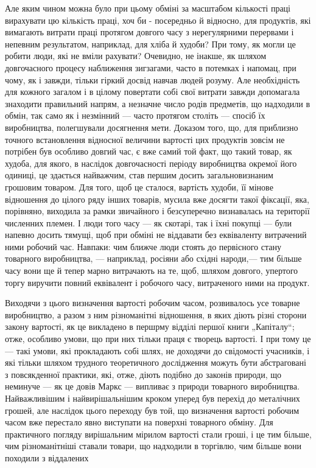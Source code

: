 Але яким чином можна було при цьому обміні за масштабом кількості праці вирахувати цю кількість праці, хоч би - посередньо й
відносно, для продуктів, які вимагають витрати праці протягом довгого часу з нерегулярними перервами і непевним результатом,
наприклад, для хліба й худоби? При тому, як могли це робити люди, які не вміли рахувати? Очевидно, не інакше, як шляхом
довгочасного процесу наближення зигзагами, часто в потемках і напомац, при чому, як і завжди, тільки гіркий досвід навчав
людей розуму. Але необхідність для кожного загалом і в цілому повертати собі свої витрати завжди допомагала знаходити
правильний напрям, а незначне число родів предметів, що надходили в обмін, так само як і незмінний — часто протягом століть
— спосіб їх виробництва, полегшували досягнення мети. Доказом того, що, для приблизно точного встановлення відносної
величини вартості цих продуктів зовсім не потрібен був особливо довгий час, є вже самий той факт, що такий товар, як худоба,
для якого, в наслідок довгочасності періоду виробництва окремої його одиниці, це здається найважчим, став першим досить
загальновизнаним грошовим товаром. Для того, щоб це сталося, вартість худоби, її мінове відношення до цілого ряду інших
товарів, мусила вже досягти такої фіксації, яка, порівняно, виходила за рамки звичайного і безсуперечно визнавалась на
території численних племен. І люди того часу — як скотарі, так і їхні покупці — були напевно досить тямущі, щоб при обміні
не віддавати без еквіваленту витрачений ними робочий час. Навпаки: чим ближче люди стоять до первісного стану товарного
виробництва, — наприклад, росіяни або східні народи,—  тим більше часу вони ще й тепер марно витрачають на те, щоб, шляхом
довгого, упертого торгу виручити повний еквівалент і робочого часу, витраченого ними на продукт.

Виходячи з цього визначення
вартості робочим часом, розвивалось усе товарне виробництво, а разом з ним різноманітні відношення, в яких діють різні
сторони закону вартості, як це викладено в першрму відділі першої книги „Капіталу“; отже, особливо умови, що при них
тільки праця є творець вартості. І при тому це — такі умови, які прокладають собі шлях, не доходячи до свідомості учасників,
і які тільки шляхом трудного теоретичного дослідження можуть бути абстраговані з повсякденної практики, які, отже, діють
подібно до законів природи, що неминуче — як це довів Маркс — випливає з природи товарного виробництва. Найважливішим і
найвирішальнішим кроком уперед був перехід до металічних грошей, але наслідок цього переходу був той, що визначення вартості
робочим часом вже перестало явно виступати на поверхні товарного обміну. Для практичного погляду вирішальним мірилом
вартості стали гроші, і це тим більше, чим різноманітніші ставали товари, що надходили в торгівлю, чим більше вони походили
з віддалених
\parbreak{}  %
